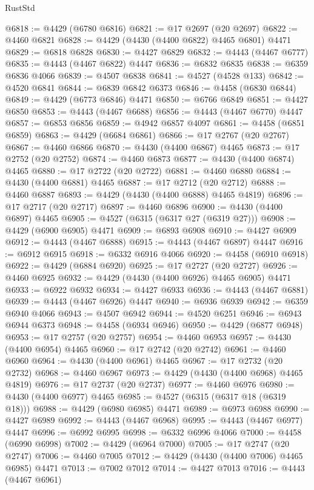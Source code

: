 \begin{lexlean}{RustStd}
\begin{coremodule}
{\begin{coremodule}
{{{{{{{{{{{{{{{{{{{{{{{{{{{{{{{{{{{{{{{{{{{{{{{{{{{{{{{{{{{{{{{{{{{{@6818 := @4429 (@6780 @6816)
@6821 := @17 @2697 (@20 @2697)
@6822 := @4460 @6821
@6828 := @4429 (@4430 (@4400 @6822) @4465 @6801) @4471
@6829 := @6818 @6828
@6830 := @4427 @6829
@6832 := @4443 (@4467 @6777)
@6835 := @4443 (@4467 @6822) @4447
@6836 := @6832 @6835
@6838 := @6359 @6836 @4066
@6839 := @4507 @6838
@6841 := @4527 (@4528 @133)
@6842 := @4520 @6841
@6844 := @6839 @6842 @6373
@6846 := @4458 (@6830 @6844)
@6849 := @4429 (@6773 @6846) @4471
@6850 := @6766 @6849
@6851 := @4427 @6850
@6853 := @4443 (@4467 @6688)
@6856 := @4443 (@4467 @6770) @4447
@6857 := @6853 @6856
@6859 := @4942 @6857 @4097
@6861 := @4458 (@6851 @6859)
@6863 := @4429 (@6684 @6861)
@6866 := @17 @2767 (@20 @2767)
@6867 := @4460 @6866
@6870 := @4430 (@4400 @6867) @4465
@6873 := @17 @2752 (@20 @2752)
@6874 := @4460 @6873
@6877 := @4430 (@4400 @6874) @4465
@6880 := @17 @2722 (@20 @2722)
@6881 := @4460 @6880
@6884 := @4430 (@4400 @6881) @4465
@6887 := @17 @2712 (@20 @2712)
@6888 := @4460 @6887
@6893 := @4429 (@4430 (@4400 @6888) @4465 @4819)
@6896 := @17 @2717 (@20 @2717)
@6897 := @4460 @6896
@6900 := @4430 (@4400 @6897) @4465
@6905 := @4527 (@6315 (@6317 @27 (@6319 @27)))
@6908 := @4429 (@6900 @6905) @4471
@6909 := @6893 @6908
@6910 := @4427 @6909
@6912 := @4443 (@4467 @6888)
@6915 := @4443 (@4467 @6897) @4447
@6916 := @6912 @6915
@6918 := @6332 @6916 @4066
@6920 := @4458 (@6910 @6918)
@6922 := @4429 (@6884 @6920)
@6925 := @17 @2727 (@20 @2727)
@6926 := @4460 @6925
@6932 := @4429 (@4430 (@4400 @6926) @4465 @6905) @4471
@6933 := @6922 @6932
@6934 := @4427 @6933
@6936 := @4443 (@4467 @6881)
@6939 := @4443 (@4467 @6926) @4447
@6940 := @6936 @6939
@6942 := @6359 @6940 @4066
@6943 := @4507 @6942
@6944 := @4520 @6251
@6946 := @6943 @6944 @6373
@6948 := @4458 (@6934 @6946)
@6950 := @4429 (@6877 @6948)
@6953 := @17 @2757 (@20 @2757)
@6954 := @4460 @6953
@6957 := @4430 (@4400 @6954) @4465
@6960 := @17 @2742 (@20 @2742)
@6961 := @4460 @6960
@6964 := @4430 (@4400 @6961) @4465
@6967 := @17 @2732 (@20 @2732)
@6968 := @4460 @6967
@6973 := @4429 (@4430 (@4400 @6968) @4465 @4819)
@6976 := @17 @2737 (@20 @2737)
@6977 := @4460 @6976
@6980 := @4430 (@4400 @6977) @4465
@6985 := @4527 (@6315 (@6317 @18 (@6319 @18)))
@6988 := @4429 (@6980 @6985) @4471
@6989 := @6973 @6988
@6990 := @4427 @6989
@6992 := @4443 (@4467 @6968)
@6995 := @4443 (@4467 @6977) @4447
@6996 := @6992 @6995
@6998 := @6332 @6996 @4066
@7000 := @4458 (@6990 @6998)
@7002 := @4429 (@6964 @7000)
@7005 := @17 @2747 (@20 @2747)
@7006 := @4460 @7005
@7012 := @4429 (@4430 (@4400 @7006) @4465 @6985) @4471
@7013 := @7002 @7012
@7014 := @4427 @7013
@7016 := @4443 (@4467 @6961)
}}}}}}}}}}}}}}}}}}}}}}}}}}}}}}}}}}}}}}}}}}}}}}}}}}}}}}}}}}}}}}}}}}}}
\end{coremodule}}
\end{coremodule}
\end{lexlean}
